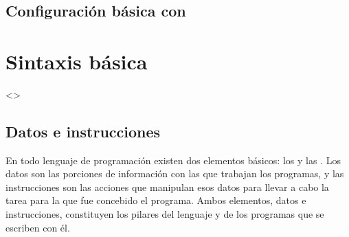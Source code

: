 \documentclass[a4paper,12pt,spanish]{sphinxmanual}
\begin{document}
\subsection{Configuración básica con }
\label{\detokenize{php:configuracion-basica-con-php-ini}}

\subsubsection{}
\label{\detokenize{php:error-reporting-e-all}}

\subsubsection{}
\label{\detokenize{php:display-errors-on}}

\subsubsection{}
\label{\detokenize{php:display-startup-errors-on}}

\subsubsection{}
\label{\detokenize{php:date-timezone-utc}}

\section{Sintaxis básica}
\label{\detokenize{php:sintaxis-basica}}
\textless{}\textgreater{}


\subsection{Datos e instrucciones}
\label{\detokenize{php:datos-e-instrucciones}}
\ignorespaces 
En todo lenguaje de programación existen dos elementos básicos: los  y
las . Los datos son las porciones de información con las que
trabajan los programas, y las instrucciones son las acciones que manipulan esos
datos para llevar a cabo la tarea para la que fue concebido el programa. Ambos
elementos, datos e instrucciones, constituyen los pilares del lenguaje y de los
programas que se escriben con él.
\end{document}
